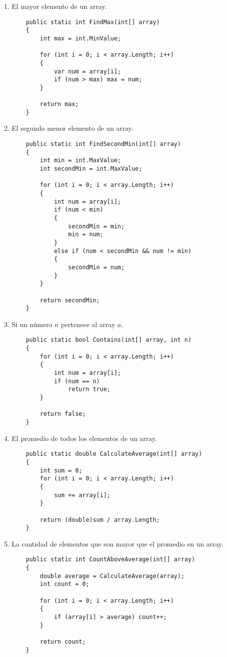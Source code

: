 \begin{enumerate}[label=\alph*)]
    \item El mayor elemento de un array.
    \begin{lstlisting}
    public static int FindMax(int[] array)
    {
        int max = int.MinValue;
        
        for (int i = 0; i < array.Length; i++)
        {
            var num = array[i];
            if (num > max) max = num;
        }

        return max;
    }
    \end{lstlisting}
    \item El segundo menor elemento de un array.
    \begin{lstlisting}
    public static int FindSecondMin(int[] array)
    {
        int min = int.MaxValue;
        int secondMin = int.MaxValue;
        
        for (int i = 0; i < array.Length; i++)
        {
            int num = array[i];
            if (num < min)
            {
                secondMin = min;
                min = num;
            }
            else if (num < secondMin && num != min)
            {
                secondMin = num;
            }
        }

        return secondMin;
    }
    \end{lstlisting}
    \item Si un número \(n\) pertenece al array \(a\).
    \begin{lstlisting}
    public static bool Contains(int[] array, int n)
    {
        for (int i = 0; i < array.Length; i++)
        {
            int num = array[i];
            if (num == n)
                return true;
        }

        return false;
    }
    \end{lstlisting}
    \item El promedio de todos los elementos de un array.
    \begin{lstlisting}
    public static double CalculateAverage(int[] array)
    {
        int sum = 0;
        for (int i = 0; i < array.Length; i++)
        {
            sum += array[i];
        }

        return (double)sum / array.Length;
    }
    \end{lstlisting}
    \item La cantidad de elementos que son mayor que el promedio en un array.
    \begin{lstlisting}
    public static int CountAboveAverage(int[] array)
    {
        double average = CalculateAverage(array);
        int count = 0;
        
        for (int i = 0; i < array.Length; i++)
        {
            if (array[i] > average) count++;
        }

        return count;
    }
    \end{lstlisting}
\end{enumerate}